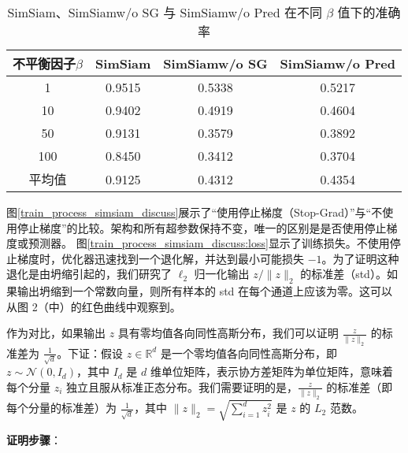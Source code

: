 \documentclass[master]{thesis-uestc}
\begin{document}
\begin{table}
    \caption{SimSiam、SimSiamw/o SG 与 SimSiamw/o Pred 在不同 $\beta$ 值下的准确率}
    \centering
    \begin{tabular}{cccc}
    \toprule
    不平衡因子$\beta$  & SimSiam & SimSiamw/o SG & SimSiamw/o Pred \\
    \midrule
    1   & 0.9515  & 0.5338  & 0.5217 \\
    10  & 0.9402  & 0.4919  & 0.4604 \\
    50  & 0.9131  & 0.3579  & 0.3892 \\
    100 & 0.8450  & 0.3412  & 0.3704 \\
    \midrule
    平均值 & 0.9125 & 0.4312 & 0.4354\\
    \bottomrule
    \end{tabular}
    \label{simsiam_vs_simsiamwosg_wopred}
\end{table}

图\ref{train_process_simsiam_discuss}展示了“使用停止梯度（Stop-Grad）”与“不使用停止梯度”的比较。架构和所有超参数保持不变，唯一的区别是是否使用停止梯度或预测器。
图\ref{train_process_simsiam_discuss:loss}显示了训练损失。不使用停止梯度时，优化器迅速找到一个退化解，并达到最小可能损失 \(-1\)。为了证明这种退化是由坍缩引起的，我们研究了 \(\ell_2\) 归一化输出 \( z / \|z\|_2 \) 的标准差（std）。如果输出坍缩到一个常数向量，则所有样本的 std 在每个通道上应该为零。这可以从图 2（中）的红色曲线中观察到。


作为对比，如果输出 \( z \) 具有零均值各向同性高斯分布，我们可以证明 \( \frac{z}{\|z\|_2} \) 的标准差为 \( \frac{1}{\sqrt{d}} \)。下证：假设 \( z \in \mathbb{R}^d \) 是一个零均值各向同性高斯分布，即 \( z \sim \mathcal{N}(0, I_d) \)，其中 \( I_d \) 是 \( d \) 维单位矩阵，表示协方差矩阵为单位矩阵，意味着每个分量 \( z_i \) 独立且服从标准正态分布。我们需要证明的是，\( \frac{z}{\|z\|_2} \) 的标准差（即每个分量的标准差）为 \( \frac{1}{\sqrt{d}} \)，其中 \( \|z\|_2 = \sqrt{\sum_{i=1}^{d} z_i^2} \) 是 \( z \) 的 \( L_2 \) 范数。

\textbf{证明步骤}：
\end{document}
